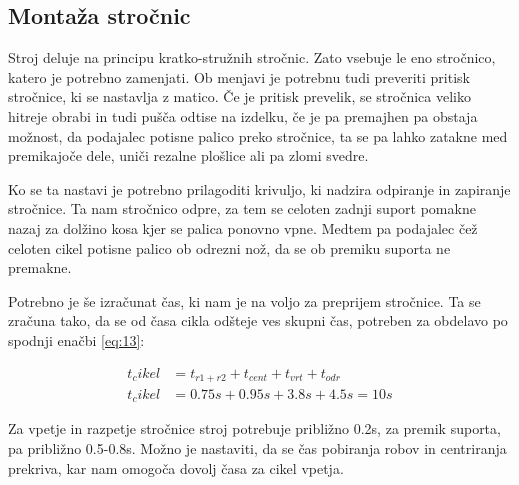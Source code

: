 \newpage

\subsection{Montaža stročnic}
Stroj deluje na principu kratko-stružnih stročnic. Zato vsebuje le eno stročnico,
katero je potrebno zamenjati. Ob menjavi je potrebnu tudi preveriti pritisk
stročnice, ki se nastavlja z matico. Če je pritisk prevelik, se stročnica veliko
hitreje obrabi in tudi pušča odtise na izdelku, če je pa premajhen pa obstaja možnost,
da podajalec potisne palico preko stročnice, ta se pa lahko zatakne med 
premikajoče dele, uniči rezalne plošlice ali pa zlomi svedre.

Ko se ta nastavi je potrebno prilagoditi krivuljo, ki nadzira odpiranje in 
zapiranje stročnice. Ta nam stročnico odpre, za tem se celoten zadnji suport
pomakne nazaj za dolžino kosa kjer se palica ponovno vpne. Medtem pa podajalec
čež celoten cikel potisne palico ob odrezni nož, da se ob premiku suporta ne premakne.

Potrebno je še izračunat čas, ki nam je na voljo za preprijem stročnice. 
Ta se zračuna tako, da se od časa cikla odšteje ves skupni čas, potreben 
za obdelavo po spodnji enačbi \ref{eq:13}:

\begin{equation}
    \label{eq:13}
    \begin{split}
        t_cikel &= t_{r1+r2} + t_{cent} + t_{vrt} + t_{odr} \\
        t_cikel &= 0.75s + 0.95s + 3.8s + 4.5s = 10s 
    \end{split}
\end{equation}

Za vpetje in razpetje stročnice stroj potrebuje približno 0.2s, za premik 
suporta, pa približno 0.5-0.8s. Možno je nastaviti, da se čas pobiranja robov
in centriranja prekriva, kar nam omogoča dovolj časa za cikel vpetja. 